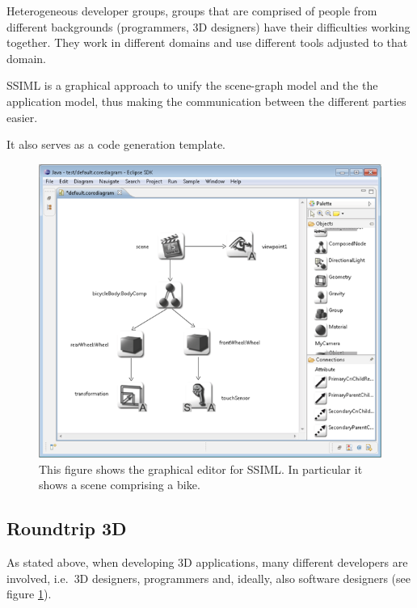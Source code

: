 Heterogeneous developer groups, groups that are comprised of people from
different backgrounds (programmers, \gls{3D} designers) have their difficulties
working together. They work in different domains and use different tools
adjusted to that domain. \cite{Glinz:2015:SUS:2802768.2802838}

SSIML is a graphical approach to unify the scene-graph model and the the
application model, thus making the communication between the different
parties easier.

It also serves as a code generation template.

\begin{figure}
  \centering
  \includegraphics[width=12cm]{../assets/SSIML.png}
	\caption{This figure shows the graphical editor for SSIML. In particular it shows a scene comprising a bike. \cite{roundtrip3dwebsite}}
	\label{fig:ssimldiagram}
\end{figure}

\subsection{Roundtrip 3D}\label{roundtrip-3d}

As stated above, when developing \gls{3D} applications, many different
developers are involved, i.e.~\gls{3D} designers, programmers and, ideally,
also software designers (see figure \ref{fig:ssimldiagram}).


